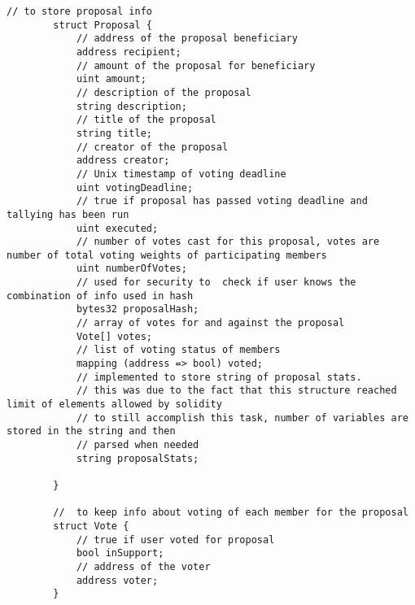 \documentclass{article}
\begin{document}
\begin{lstlisting}[style=MyCStyle]
        // to store proposal info
        struct Proposal {
            // address of the proposal beneficiary
            address recipient;
            // amount of the proposal for beneficiary
            uint amount;
            // description of the proposal
            string description;
            // title of the proposal
            string title;
            // creator of the proposal
            address creator;
            // Unix timestamp of voting deadline
            uint votingDeadline;
            // true if proposal has passed voting deadline and tallying has been run
            uint executed;
            // number of votes cast for this proposal, votes are number of total voting weights of participating members
            uint numberOfVotes;
            // used for security to  check if user knows the combination of info used in hash
            bytes32 proposalHash;
            // array of votes for and against the proposal
            Vote[] votes;
            // list of voting status of members
            mapping (address => bool) voted;
            // implemented to store string of proposal stats.
            // this was due to the fact that this structure reached limit of elements allowed by solidity
            // to still accomplish this task, number of variables are stored in the string and then
            // parsed when needed
            string proposalStats;

        }

        //  to keep info about voting of each member for the proposal
        struct Vote {
            // true if user voted for proposal
            bool inSupport;
            // address of the voter
            address voter;
        }






\end{lstlisting}
\end{document}
